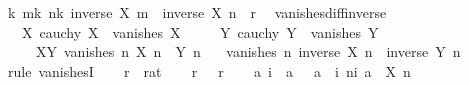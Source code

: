\begin{isabellebody}
\ {\isachardoublequoteopen}{\isasymexists}k{\isachardot}{\kern0pt}\ {\isasymforall}m{\isasymge}k{\isachardot}{\kern0pt}\ {\isasymforall}n{\isasymge}k{\isachardot}{\kern0pt}\ {\isasymbar}inverse\ {\isacharparenleft}{\kern0pt}X\ m{\isacharparenright}{\kern0pt}\ {\isacharminus}{\kern0pt}\ inverse\ {\isacharparenleft}{\kern0pt}X\ n{\isacharparenright}{\kern0pt}{\isasymbar}\ {\isacharless}{\kern0pt}\ r{\isachardoublequoteclose}\ \isacommand{{\isachardot}{\kern0pt}{\isachardot}{\kern0pt}}\isamarkupfalse%
\isanewline
{}\isamarkupfalse%
%
\endisatagproof
{\isafoldproof}%
%
\isadelimproof
\isanewline
%
\endisadelimproof
\isanewline
{}\isamarkupfalse%
\ vanishes{\isacharunderscore}{\kern0pt}diff{\isacharunderscore}{\kern0pt}inverse{\isacharcolon}{\kern0pt}\isanewline
\ \ \ X{\isacharcolon}{\kern0pt}\ {\isachardoublequoteopen}cauchy\ X{\isachardoublequoteclose}\ {\isachardoublequoteopen}{\isasymnot}\ vanishes\ X{\isachardoublequoteclose}\isanewline
\ \ \ \ \ Y{\isacharcolon}{\kern0pt}\ {\isachardoublequoteopen}cauchy\ Y{\isachardoublequoteclose}\ {\isachardoublequoteopen}{\isasymnot}\ vanishes\ Y{\isachardoublequoteclose}\isanewline
\ \ \ \ \ XY{\isacharcolon}{\kern0pt}\ {\isachardoublequoteopen}vanishes\ {\isacharparenleft}{\kern0pt}{\isasymlambda}n{\isachardot}{\kern0pt}\ X\ n\ {\isacharminus}{\kern0pt}\ Y\ n{\isacharparenright}{\kern0pt}{\isachardoublequoteclose}\isanewline
\ \ \ {\isachardoublequoteopen}vanishes\ {\isacharparenleft}{\kern0pt}{\isasymlambda}n{\isachardot}{\kern0pt}\ inverse\ {\isacharparenleft}{\kern0pt}X\ n{\isacharparenright}{\kern0pt}\ {\isacharminus}{\kern0pt}\ inverse\ {\isacharparenleft}{\kern0pt}Y\ n{\isacharparenright}{\kern0pt}{\isacharparenright}{\kern0pt}{\isachardoublequoteclose}\isanewline
%
\isadelimproof
%
\endisadelimproof
%
\isatagproof
{}\isamarkupfalse%
\ {\isacharparenleft}{\kern0pt}rule\ vanishesI{\isacharparenright}{\kern0pt}\isanewline
\ \ \isamarkupfalse%
\ r\ {\isacharcolon}{\kern0pt}{\isacharcolon}{\kern0pt}\ rat\isanewline
\ \ \isamarkupfalse%
\ r{\isacharcolon}{\kern0pt}\ {\isachardoublequoteopen}{}\ {\isacharless}{\kern0pt}\ r{\isachardoublequoteclose}\isanewline
\ \ \isamarkupfalse%
\ a\ i\ \ a{\isacharcolon}{\kern0pt}\ {\isachardoublequoteopen}{}\ {\isacharless}{\kern0pt}\ a{\isachardoublequoteclose}\ \ i{\isacharcolon}{\kern0pt}\ {\isachardoublequoteopen}{\isasymforall}n{\isasymge}i{\isachardot}{\kern0pt}\ a\ {\isacharless}{\kern0pt}\ {\isasymbar}X\ n{\isasymbar}{\isachardoublequoteclose}\isanewline

\end{isabellebody}
